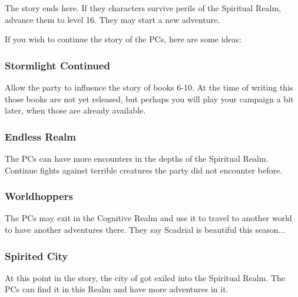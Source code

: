 The story ends here. If they characters survive perils of the Spiritual Realm, advance them to level 16. They may start a new adventure.

If you wish to continue the story of the PCs, here are some ideas:

\subsubsection{Stormlight Continued}

Allow the party to influence the story of \bookSA{} books 6-10. At the time of writing this those books are not yet released, but perhaps you will play your campaign a bit later, when those are already available.

\subsubsection{Endless Realm}

The PCs can have more encounters in the depths of the Spiritual Realm. Continue fights against terrible creatures the party did not encounter before.

\subsubsection{Worldhoppers}

The PCs may exit in the Cognitive Realm and use it to travel to another world to have another adventures there. They say Scadrial is beautiful this season...

\subsubsection{Spirited City}

At this point in the \bookSA{} story, the city of \locationKharbranth{} got exiled into the Spiritual Realm. The PCs can find it in this Realm and have more adventures in it.
